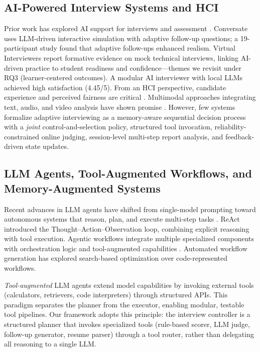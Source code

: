 ﻿\documentclass[final,3p,times,authoryear]{elsarticle}
\begin{document}
\subsection{AI-Powered Interview Systems and HCI}

\noindent Prior work has explored AI support for interviews and assessment \cite{kim2024interview,wang2023survey}. Conversate \cite{conversate2024} uses LLM-driven interactive simulation with adaptive follow-up questions; a 19-participant study found that adaptive follow-ups enhanced realism. Virtual Interviewers \cite{virtual_interviewers2025} report formative evidence on mock technical interviews, linking AI-driven practice to student readiness and confidence---themes we revisit under RQ3 (learner-centered outcomes). A modular AI interviewer \cite{modular_interviewer2025} with local LLMs achieved high satisfaction (4.45/5). From an HCI perspective, candidate experience and perceived fairness are critical \cite{kumar2022fairness}. Multimodal approaches integrating text, audio, and video analysis have shown promise \cite{wang2022multimodal}. However, few systems formalize adaptive interviewing as a memory-aware sequential decision process with a \emph{joint} control-and-selection policy, structured tool invocation, reliability-constrained online judging, session-level multi-step report analysis, and feedback-driven state updates.

\subsection{LLM Agents, Tool-Augmented Workflows, and Memory-Augmented Systems}
\label{sec:related_agents}

\noindent Recent advances in LLM agents have shifted from single-model prompting toward autonomous systems that reason, plan, and execute multi-step tasks \cite{llm_agent_survey2025,wang2023survey}. ReAct \cite{yao2023react} introduced the Thought--Action--Observation loop, combining explicit reasoning with tool execution. Agentic workflows integrate multiple specialized components with orchestration logic and tool-augmented capabilities \cite{agentic_workflow_guide2025}. Automated workflow generation \cite{aflow2024} has explored search-based optimization over code-represented workflows.

\emph{Tool-augmented} LLM agents extend model capabilities by invoking external tools (calculators, retrievers, code interpreters) through structured APIs. This paradigm separates the planner from the executor, enabling modular, testable tool pipelines. Our framework adopts this principle: the interview controller is a structured planner that invokes specialized tools (rule-based scorer, LLM judge, follow-up generator, resume parser) through a tool router, rather than delegating all reasoning to a single LLM.
\end{document}
